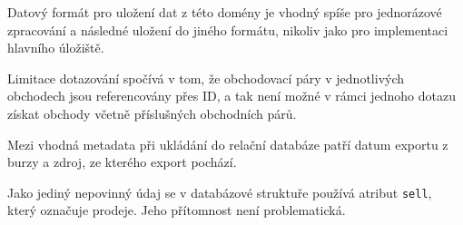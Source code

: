 \documentclass[12pt, a4paper]{article}
\begin{document}
Datový formát pro uložení dat z této domény je vhodný spíše pro jednorázové zpracování a následné uložení do jiného formátu, nikoliv jako pro implementaci hlavního úložiště.

Limitace dotazování spočívá v tom, že obchodovací páry v jednotlivých obchodech jsou referencovány přes ID, a tak není možné v rámci jednoho dotazu získat obchody včetně příslušných obchodních párů.

Mezi vhodná metadata při ukládání do relační databáze patří datum exportu z burzy a zdroj, ze kterého export pochází.

Jako jediný nepovinný údaj se v databázové struktuře používá atribut \texttt{sell}, který označuje prodeje. Jeho přítomnost není problematická.
\end{document}
